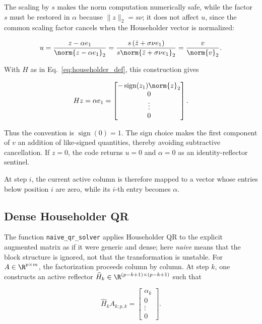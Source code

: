 \noindent The scaling by \(s\) makes the norm computation numerically safe, while the factor \(s\) must be restored in \(\alpha\) because \(\|z\|_2=s\nu\); it does not affect \(u\), since the common scaling factor cancels when the Householder vector is normalized:

\begin{equation}
    u
    = \frac{z-\alpha e_1}{\norm{z-\alpha e_1}_2}
    = \frac{s\left(\bar z+\sigma\nu e_1\right)}
           {s\norm{\bar z+\sigma\nu e_1}_2}
    = \frac{v}{\norm{v}_2}.
\end{equation}

\noindent With $H$ as in Eq.~\eqref{eq:householder_def}, this construction gives

\begin{equation}
    Hz = \alpha e_1
    = 
    \begin{bmatrix}
        -\operatorname{sign}(z_1)\norm{z}_2 \\
        0 \\
        \vdots \\
        0
    \end{bmatrix}.
\end{equation}

\noindent Thus the convention is $\operatorname{sign}(0)=1$. The sign choice makes the first component of $v$ an addition of like-signed quantities, thereby avoiding subtractive cancellation. If $z=0$, the code returns $u=0$ and $\alpha=0$ as an identity-reflector sentinel.

\noindent At step $i$, the current active column is therefore mapped to a vector whose entries below position $i$ are zero, while its $i$-th entry becomes $\alpha$.

\subsection{Dense Householder QR}

\noindent The function \texttt{naive\_qr\_solver} applies Householder QR to the
explicit augmented matrix as if it were generic and dense; here \emph{naive}
means that the block structure is ignored, not that the transformation is
unstable. For $A\in\R^{p\times m}$, the factorization proceeds column by
column. At step $k$, one constructs an active reflector
$\widehat H_k\in\R^{(p-k+1)\times(p-k+1)}$ such that

\begin{equation}
    \widehat H_k A_{k:p,k}
    =
    \begin{bmatrix}
        \alpha_k \\ 0 \\ \vdots \\ 0
    \end{bmatrix}.
\end{equation}

